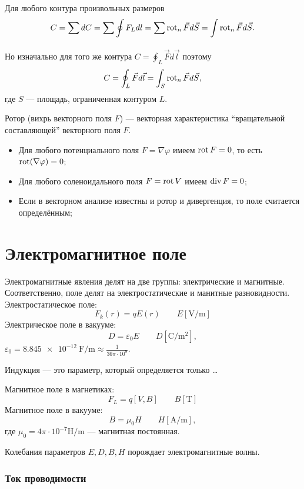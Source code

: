 Для любого контура произвольных размеров
\[
	C = \sum_{}^{} dC = \sum_{}^{} \oint F_L dl = \sum_{}^{} \operatorname{rot}_n \vec{F}
	d\vec{S} = \int \operatorname{rot}_n \vec{F} d\vec{S}
	.\]

Но изначально для того же контура $C = \oint_L \vec{F} d\vec{l}$ поэтому
\[
	C = \oint_L \vec{F} d\vec{l} = \int_S \operatorname{rot}_n \vec{F} d\vec{S}
	,\]
где $S$ --- площадь, ограниченная контуром $L$.

Ротор (вихрь векторного поля $F$) --- векторная характеристика
``вращательной составляющей'' векторного поля $F$.

\begin{itemize}
	\item Для любого потенциального поля $F = \nabla \varphi$ имеем $\operatorname{rot} F=0$, то
	      есть $\operatorname{rot}(\nabla \varphi) = 0$;
	\item Для любого соленоидального поля $F = \operatorname{rot} V$ имеем $\operatorname{div} F = 0$;
	\item Если в векторном анализе известны и ротор и дивергенция, то поле
	      считается определённым;
\end{itemize}

\section{Электромагнитное поле}

Электромагнитные явления делят на две группы: электрические и магнитные.
Соответственно, поле делят на электростатические и манитные разновидности.
Электростатическое поле:
\[ F_k(r) = qE(r) \qquad E\left[\unit{\volt\per\meter}\right] \]
Электрическое поле в вакууме:
\[ D = \varepsilon_0 E \qquad D\left[\unit{\coulomb\per\square\meter}\right], \]
$\varepsilon_0 = \qty{8.845e-12}{\farad\per\meter} \approx
	\frac{1}{36\pi \cdot 10^9}$.

Индукция --- это параметр, который определяется только \dots

Магнитное поле в магнетиках:
\[ F_L = q[V, B] \qquad B[\unit{\tesla}] \]
Магнитное поле в вакууме:
\[ B = \mu_0 H \qquad H\left[\unit{\ampere\per\meter}\right], \]
где $\mu_0 = 4\pi \cdot 10^{-7} \unit{\henry\per\meter}$ --- магнитная
постоянная.

Колебания параметров $E, D, B, H$ порождает электромагнитные волны.

\subsubsection{Ток проводимости}


